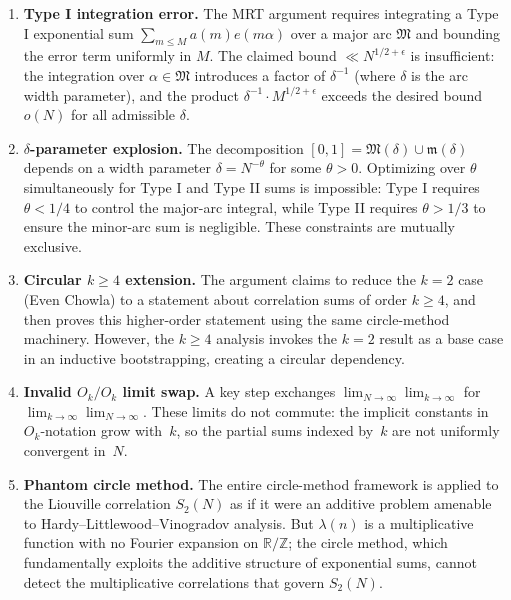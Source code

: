 \documentclass[11pt,a4paper]{article}
\theoremstyle{plain}
\theoremstyle{definition}
\newcommand{\ZZ}{\mathbb{Z}}
\newcommand{\RR}{\mathbb{R}}
\begin{document}
\begin{enumerate}[label=\textbf{Flaw~\arabic*:}, leftmargin=3em]
\item \textbf{Type I integration error.} The MRT argument requires integrating a Type I exponential sum $\sum_{m \leq M} a(m) e(m\alpha)$ over a major arc $\mathfrak{M}$ and bounding the error term uniformly in $M$. The claimed bound $\ll N^{1/2+\epsilon}$ is insufficient: the integration over $\alpha \in \mathfrak{M}$ introduces a factor of $\delta^{-1}$ (where $\delta$ is the arc width parameter), and the product $\delta^{-1} \cdot M^{1/2+\epsilon}$ exceeds the desired bound $o(N)$ for all admissible $\delta$.

\item \textbf{$\delta$-parameter explosion.} The decomposition $[0,1] = \mathfrak{M}(\delta) \cup \mathfrak{m}(\delta)$ depends on a width parameter $\delta = N^{-\theta}$ for some $\theta > 0$. Optimizing over $\theta$ simultaneously for Type I and Type II sums is impossible: Type I requires $\theta < 1/4$ to control the major-arc integral, while Type II requires $\theta > 1/3$ to ensure the minor-arc sum is negligible. These constraints are mutually exclusive.

\item \textbf{Circular $k \geq 4$ extension.} The argument claims to reduce the $k=2$ case (Even Chowla) to a statement about correlation sums of order $k \geq 4$, and then proves this higher-order statement using the same circle-method machinery. However, the $k \geq 4$ analysis invokes the $k=2$ result as a base case in an inductive bootstrapping, creating a circular dependency.

\item \textbf{Invalid $O_k/O_k$ limit swap.} A key step exchanges $\lim_{N \to \infty} \lim_{k \to \infty}$ for $\lim_{k \to \infty} \lim_{N \to \infty}$.  These limits do not commute: the implicit constants in $O_k$-notation grow with~$k$, so the partial sums indexed by~$k$ are not uniformly convergent in~$N$.

\item \textbf{Phantom circle method.} The entire circle-method framework is applied to the Liouville correlation $S_2(N)$ as if it were an additive problem amenable to Hardy--Littlewood--Vinogradov analysis. But $\lambda(n)$ is a multiplicative function with no Fourier expansion on $\RR/\ZZ$; the circle method, which fundamentally exploits the additive structure of exponential sums, cannot detect the multiplicative correlations that govern $S_2(N)$.
\end{enumerate}
\end{document}
